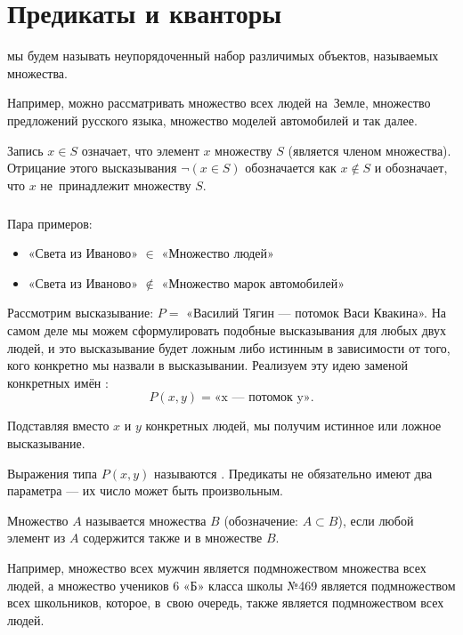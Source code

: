 \section{Предикаты и кванторы}

\begin{definition}
 мы будем называть неупорядоченный набор различимых объектов, называемых  множества.
\end{definition}

Например, можно рассматривать множество всех людей на~Земле, множество предложений русского языка, множество моделей автомобилей и так далее.

Запись $x \in S$ означает, что элемент $x$  множеству $S$ (является членом множества). Отрицание этого высказывания $\neg (x\in S)$ обозначается как $x\not \in S$ и обозначает, что $x$ не~принадлежит множеству $S$.

\subparagraph{} Пара примеров:

\begin{itemize}
\item «Света из Иваново» $\in$ «Множество людей»
\item «Света из Иваново» $\not\in$ «Множество марок автомобилей»
\end{itemize}

Рассмотрим высказывание: $P =$ «Василий Тягин — потомок Васи Квакина». На самом деле мы можем сформулировать подобные высказывания для любых двух людей, и это высказывание будет ложным либо истинным в зависимости от того, кого конкретно мы назвали в высказывании. Реализуем эту идею заменой конкретных имён : $$ P(x, y) = \mbox{«x~— потомок y»}. $$

Подставляя вместо $x$ и $y$ конкретных людей, мы получим истинное или ложное высказывание.

Выражения типа $P(x, y)$ называются . Предикаты не обязательно имеют два параметра — их число может быть произвольным.

\begin{definition}
Множество $A$ называется  множества $B$ (обозначение: $A \subset B$), если любой элемент из $A$ содержится также и в множестве $B$.
\end{definition}

Например, множество всех мужчин является подмножеством множества всех людей, а множество учеников 6 «Б» класса школы №469 является подмножеством всех школьников, которое, в~свою очередь, также является подмножеством всех людей.

